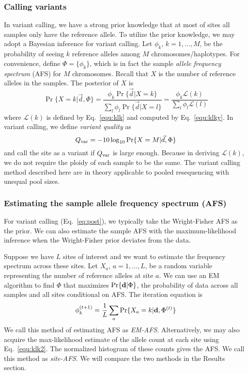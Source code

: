 \documentclass{bioinfo}
\begin{document}
\begin{methods}
\subsubsection{Calling variants}
In variant calling, we have a strong prior knowledge that at most of sites all
samples only have the reference allele.  To utilize the prior knowledge, we
may adopt a Bayesian inference for variant calling.  Let $\phi_k$, $k=1,\ldots,M$,
be the probability of seeing $k$ reference alleles among $M$
chromosomes/haplotypes. For convenience, define $\Phi=\{\phi_k\}$, which is in
fact the sample \emph{allele frequency spectrum} (AFS) for $M$ chromosomes.
Recall that $X$ is the number of reference alleles in the samples. The posterior of
$X$ is
\begin{equation}\label{eq:post}
\Pr\{X=k|\vec{d},\Phi\}=\frac{\phi_k\Pr\{\vec{d}|X=k\}}{\sum_l\phi_l\Pr\{\vec{d}|X=l\}}
=\frac{\phi_k\mathcal{L}(k)}{\sum_l\phi_l\mathcal{L}(l)}
\end{equation}
where $\mathcal{L}(k)$ is defined by Eq.~\eqref{equ:klk} and computed by
Eq.~\eqref{equ:klky}.  In variant calling, we define \emph{variant quality} as
$$
Q_{\rm var}=-10\log_{10}\Pr\{X=M|\vec{d},\Phi\}
$$
and call the site as a variant if $Q_{\rm var}$ is large enough. Because in
deriving $\mathcal{L}(k)$, we do not require the ploidy of each sample to be
the same. The variant calling method described here are in theory applicable to
pooled resequencing with unequal pool sizes.

\subsubsection{Estimating the sample allele frequency spectrum (AFS)}
For variant calling (Eq.~\ref{eq:post}), we typically take the Wright-Fisher AFS as the prior. We
can also estimate the sample AFS with the maximum-likelihood inference when the
Wright-Fisher prior deviates from the data.

Suppose we have $L$ sites of interest and we want to estimate the frequency
spectrum across these sites.  Let $X_a$, $a=1,\ldots,L$, be a random variable
representing the number of reference alleles at site $a$. We can use an EM
algorithm to find $\Phi$ that maximizes
$\Pr\{{\bf d}|\Phi\}$, the probability of data across all samples and all sites conditional on AFS.
The iteration equation is
\begin{equation}\label{eq:afs}
\phi_k^{(t+1)}=\frac{1}{L}\sum_a\Pr\{X_a=k|{\bf d},\Phi^{(t)}\}
\end{equation}
We call this method of estimating AFS as \emph{EM-AFS}. Alternatively, we may
also acquire the max-likelihood estimate of the allele count at each site using
Eq.~\eqref{equ:klk2}. The normalized histogram of these counts gives the AFS.
We call this method as \emph{site-AFS}. We will compare the two methods in the
Results section.


\end{methods}
\end{document}
